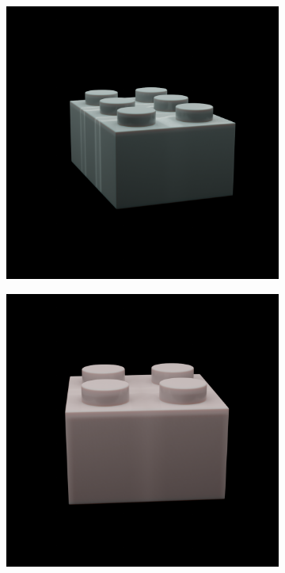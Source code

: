 \documentclass[]{article}
\begin{document}
\begin{figure}[h]
\begin{subfigure}[b]{0.2\textwidth}
    \end{subfigure}
    \begin{subfigure}[b]{0.2\textwidth}
        \includegraphics[width=\textwidth]{generated images/27.png}
    \end{subfigure}
    \begin{subfigure}[b]{0.2\textwidth}
        \includegraphics[width=\textwidth]{generated images/28.png}

\end{subfigure}
\end{figure}
\end{document}

